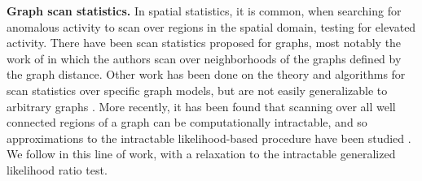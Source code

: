 {\bf Graph scan statistics.}
In spatial statistics, it is common, when searching for anomalous activity to scan over regions in the spatial domain, testing for elevated activity\cite{neill2004rapid,agarwal2006spatial}.
There have been scan statistics proposed for graphs, most notably the work of \cite{priebe2005scan} in which the authors scan over neighborhoods of the graphs defined by the graph distance.
Other work has been done on the theory and algorithms for scan statistics over specific graph models, but are not easily generalizable to arbitrary graphs \cite{yi2009unified, arias2011detection}.
More recently, it has been found that scanning over all well connected regions of a graph can be computationally intractable, and so approximations to the intractable likelihood-based procedure have been studied \cite{sharpnack2012changepoint,sharpnack2012detecting}.
We follow in this line of work, with a relaxation to the intractable generalized likelihood ratio test.



